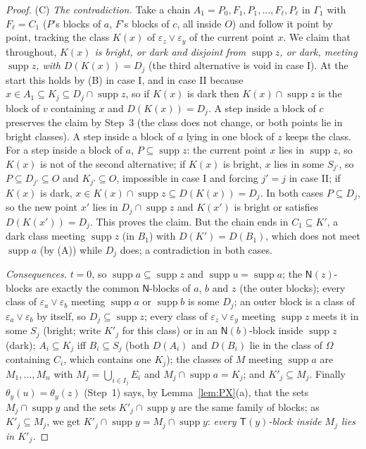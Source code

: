 \documentclass[11pt]{amsart}
\theoremstyle{definition}
\newcommand{\supp}{\operatorname{supp}}
\newcommand{\T}{\mathsf{T}}
\newcommand{\N}{\mathsf{N}}
\begin{document}
\begin{proof}
(C) \emph{The contradiction.} Take a chain $A_1=P_0,F_1,P_1,\dots,F_\ell,P_\ell$ in $\Gamma_1$ with $F_\ell=C_1$ ($P$'s blocks of $a$, $F$'s blocks of $c$, all inside $O$) and follow it point by point, tracking the class $K(x)$ of $\varepsilon_z\vee\varepsilon_y$ of the current point $x$. We claim that throughout, \emph{$K(x)$ is bright, or dark and disjoint from $\supp z$, or dark, meeting $\supp z$, with $D(K(x))=D_j$} (the third alternative is void in case I). At the start this holds by (B) in case I, and in case II because $x\in A_1\subseteq K_j\subseteq D_j\cap\supp z$, so if $K(x)$ is dark then $K(x)\cap\supp z$ is the block of $v$ containing $x$ and $D(K(x))=D_j$. A step inside a block of $c$ preserves the claim by Step~3 (the class does not change, or both points lie in bright classes). A step inside a block of $a$ lying in one block of $z$ keeps the class. For a step inside a block of $a$, $P\subseteq\supp z$: the current point $x$ lies in $\supp z$, so $K(x)$ is not of the second alternative; if $K(x)$ is bright, $x$ lies in some $S_{j'}$, so $P\subseteq D_{j'}\subseteq O$ and $K_{j'}\subseteq O$, impossible in case I and forcing $j'=j$ in case II; if $K(x)$ is dark, $x\in K(x)\cap\supp z\subseteq D(K(x))=D_j$. In both cases $P\subseteq D_j$, so the new point $x'$ lies in $D_j\cap\supp z$ and $K(x')$ is bright or satisfies $D(K(x'))=D_j$. This proves the claim. But the chain ends in $C_1\subseteq K'$, a dark class meeting $\supp z$ (in $B_1$) with $D(K')=D(B_1)$, which does not meet $\supp a$ (by (A)) while $D_j$ does; a contradiction in both cases.

\emph{Consequences.} $t=0$, so $\supp a\subseteq\supp z$ and $\supp u=\supp a$; the $\N(z)$-blocks are exactly the common $\N$-blocks of $a$, $b$ and $z$ (the outer blocks); every class of $\varepsilon_a\vee\varepsilon_b$ meeting $\supp a$ or $\supp b$ is some $D_j$; an outer block is a class of $\varepsilon_a\vee\varepsilon_b$ by itself, so $D_j\subseteq\supp z$; every class of $\varepsilon_z\vee\varepsilon_y$ meeting $\supp z$ meets it in some $S_j$ (bright; write $K'_j$ for this class) or in an $\N(b)$-block inside $\supp z$ (dark); $A_i\subseteq K_j$ iff $B_i\subseteq S_j$ (both $D(A_i)$ and $D(B_i)$ lie in the class of $\Omega$ containing $C_i$, which contains one $K_j$); the classes of $M$ meeting $\supp a$ are $M_1,\dots,M_n$ with $M_j=\bigcup_{i\in I_j}E_i$ and $M_j\cap\supp a=K_j$; and $K'_j\subseteq M_j$. Finally $\theta_y(u)=\theta_y(z)$ (Step~1) says, by Lemma~\ref{lem:PX}(a), that the sets $M_j\cap\supp y$ and the sets $K'_j\cap\supp y$ are the same family of blocks; as $K'_j\subseteq M_j$, we get $K'_j\cap\supp y=M_j\cap\supp y$: \emph{every $\T(y)$-block inside $M_j$ lies in $K'_j$.}


\end{proof}
\end{document}
